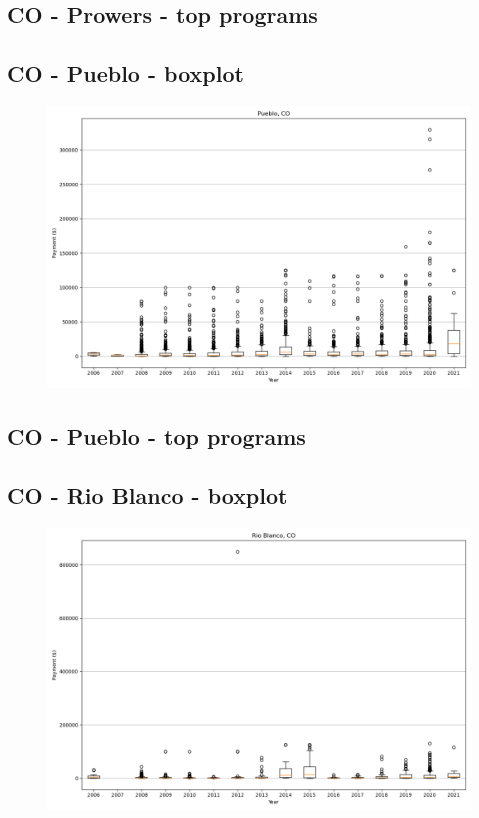 \subsection*{CO - Prowers - top programs}

\newpage
\subsection*{CO - Pueblo - boxplot}
\begin{figure}[h]
\centering
\includegraphics[width=7in]{../output/boxplots/counties/Pueblo-CO_boxplot.png}
\end{figure}


\subsection*{CO - Pueblo - top programs}

\newpage
\subsection*{CO - Rio Blanco - boxplot}
\begin{figure}[h]
\centering
\includegraphics[width=7in]{../output/boxplots/counties/Rio Blanco-CO_boxplot.png}
\end{figure}


